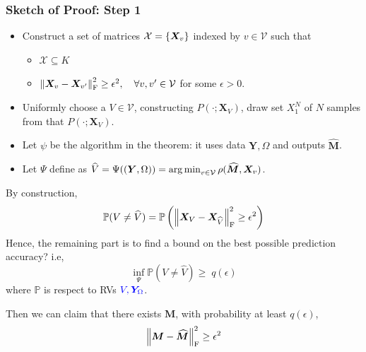 \documentclass[10pt,xcolor={usenames,dvipsnames,table},aspectratio=169]{beamer}
\begin{document}
\begin{frame}
\frametitle{Sketch of Proof: Step 1}   
\begin{itemize}
    \item Construct a set of matrices $\mathcal{X} = \left\{\bm{X}_v\right\}$ indexed by $v \in \mathcal{V}$ such that
        \begin{itemize}
            \item $\mathcal{X} \subseteq K$
            \item $\left\lVert\bm{X}_v - \bm{X}_{v'}\right\rVert_{\rm F}^2 \geq \epsilon^2, \quad \forall v, v' \in \mathcal{V}$ for some $\epsilon>0$.
        \end{itemize}
    \item Uniformly choose a $V \in \mathcal{V}$, constructing $P(\cdot; \bm{X}_V)$, draw set $X_1^{N}$ of $N$ samples from that  $P(\cdot; \bm{X}_V)$.
    \item Let $\psi$ be the algorithm in the theorem: it uses data $\bm{Y}, \Omega$ and outputs $\widehat{\bm{M}}$.
    \item Let $\Psi$ define as  $\widehat{V} = \Psi((\bm{Y}, \Omega)) = \operatorname*{arg\,min}_{v \in \mathcal{V}} \rho(\widehat{\bm{M}}, \bm{X}_v)$.
\end{itemize}
        By construction, 
        \[
        \mathbb{P}(V \neq \widehat{V}) = \mathbb{P} \left(\left\lVert\bm{X}_{V} - \bm{X}_{\widehat{V}}\right\rVert_{\rm F}^2 \geq \epsilon^2 \right)
        \] 
        Hence, the remaining part is to find a bound on the best possible prediction accuracy? i.e,
        \[
        \inf_{\Psi} \mathbb{P}(V \neq \widehat{V})  \geq \; q(\epsilon)
        \] 
        where $\mathbb{P}$ is respect to RVs ${\color{blue} V, \bm{Y}_{\Omega}}$.

        Then we can claim that there exists $\bm{M}$, with probability at least $q(\epsilon)$,
        \[
        \left\lVert\bm{M} - \widehat{\bm{M}}\right\rVert_{\rm F}^2 \geq \epsilon^2
        \] 
\end{frame}
\end{document}
